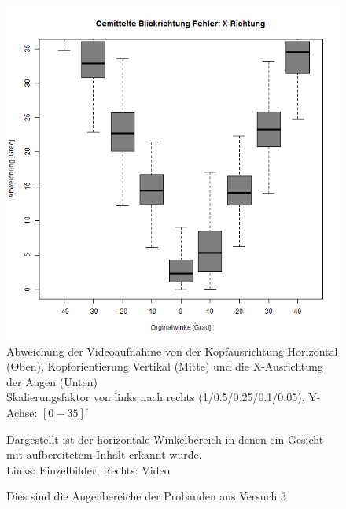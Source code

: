 \begin{landscape}
\begin{figure}
		\includegraphics[width=0.192\linewidth]{OpenFace_Img/EyeAVG_x_Err_S005}
		\caption{Abweichung der Videoaufnahme von der Kopfausrichtung Horizontal (Oben), Kopforientierung Vertikal (Mitte) und die X-Ausrichtung der Augen (Unten)\\Skalierungsfaktor von links nach rechts (1/0.5/0.25/0.1/0.05), Y-Achse: $[0-35]^\circ$}
		\label{graph_VideoSkalierung_Err}
	\end{figure}
\end{landscape}
\begin{figure}
	\centering
		
		
	\caption{Dargestellt ist der horizontale Winkelbereich in denen ein Gesicht mit aufbereitetem Inhalt erkannt wurde.\\
		Links: Einzelbilder, Rechts: Video}
	\label{graph_Test_1_Resize}
\end{figure}
\begin{landscape}
\begin{figure}
	\centering
	
	\caption{Dies sind die Augenbereiche der Probanden aus Versuch 3}
	\label{Augenbereich_Versuch3}
\end{figure}
\end{landscape}
